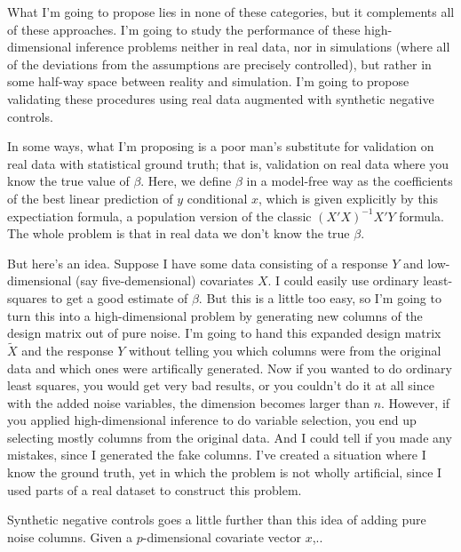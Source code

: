 \documentclass[11pt]{article}
\begin{document}
What I'm going to propose lies in none of these categories, but it
complements all of these approaches.  I'm going to study the
performance of these high-dimensional inference problems neither in
real data, nor in simulations (where all of the deviations from the
assumptions are precisely controlled), but rather in some half-way
space between reality and simulation.  I'm going to propose validating
these procedures using real data augmented with synthetic negative
controls.

In some ways, what I'm proposing is a poor man's substitute for
validation on real data with statistical ground truth; that is,
validation on real data where you know the true value of $\beta$.
Here, we define $\beta$ in a model-free way as the coefficients of the
best linear prediction of $y$ conditional $x$, which is given
explicitly by this expectiation formula, a population version of the
classic $(X'X)^{-1} X'Y$ formula.  The whole problem is that in real
data we don't know the true $\beta$.

But here's an idea.  Suppose I have some data consisting of a response
$Y$ and low-dimensional (say five-demensional) covariates $X$.  I
could easily use ordinary least-squares to get a good estimate of
$\beta$.  But this is a little too easy, so I'm going to turn this
into a high-dimensional problem by generating new columns of the
design matrix out of pure noise.  I'm going to hand this expanded
design matrix $\tilde{X}$ and the response $Y$ without telling you
which columns were from the original data and which ones were
artifically generated.  Now if you wanted to do ordinary least
squares, you would get very bad results, or you couldn't do it at all
since with the added noise variables, the dimension becomes larger
than $n$.  However, if you applied high-dimensional inference to do
variable selection, you end up selecting mostly columns from the
original data.  And I could tell if you made any mistakes, since I
generated the fake columns.  I've created a situation where I know the
ground truth, yet in which the problem is not wholly artificial, since
I used parts of a real dataset to construct this problem.

Synthetic negative controls goes a little further than this idea of
adding pure noise columns.  Given a $p$-dimensional covariate vector $x$,..
\end{document}
